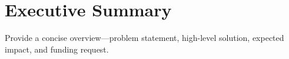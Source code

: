 \chapter{Executive Summary}
\label{chap:exec-summary}

Provide a concise overview—problem statement, high-level solution, expected impact, and funding request.
